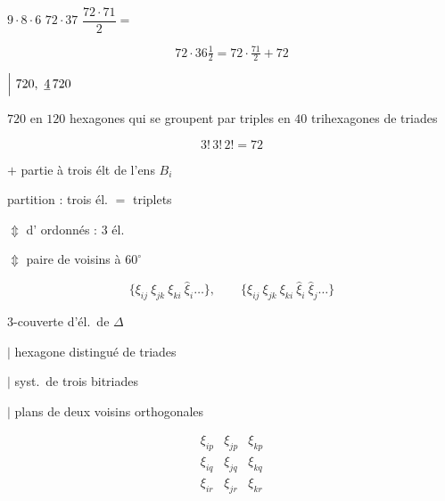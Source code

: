 \documentclass[11pt,a4paper]{article}
\begin{document}
 \qquad $9 \cdot 8 \cdot 6$ \qquad $72 \cdot 37$ \qquad $\dfrac{72 \cdot 71}{2} =$

\[
72 \cdot 36\tfrac{1}{2} = 72 \cdot \tfrac{71}{2} + 72
\]

 \ill{} \qquad
{} \quad $\Big|\ 720,\ \uncertain{4}\,720$

$720$  en $120$ hexagones qui se groupent par triples en $40$ trihexagones de triades

\[
3!\, 3!\, 2! = 72
\]

 $+$ partie à trois élt de l'ens $B_i$ \ill{}

\uncertain{$\Updownarrow$} partition \ill{} : trois él. $=$ triplets

$\Updownarrow$ \struck{\ill{}}   d' ordonnés : $3$ él.

$\Updownarrow$ paire de voisins à $60^\circ$

\[
\{\xi_{ij}\ \xi_{jk}\ \xi_{ki}\ \hat\xi_i \ldots\}, \qquad \{\xi_{ij}\ \xi_{jk}\ \xi_{ki}\ \hat\xi_i\ \hat\xi_j \ldots\}
\]


 3-couverte d'él.\ de $\Delta$

$\big|$ hexagone distingué de triades

$\big|$ syst.\ de trois bitriades  

$\big|$ plans de deux voisins  orthogonales

\[
\begin{matrix}
\xi_{ip} & \xi_{jp} & \xi_{kp}\\
\xi_{iq} & \xi_{jq} & \xi_{kq}\\
\xi_{ir} & \xi_{jr} & \xi_{kr}
\end{matrix}
\]

\end{document}
